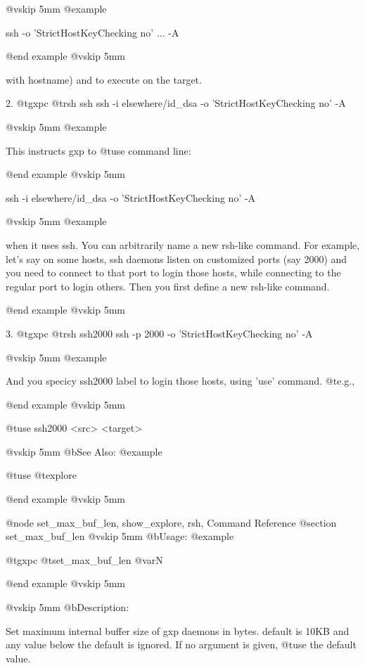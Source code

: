 @vskip 5mm
@example

         ssh -o 'StrictHostKeyChecking no' ... -A %

@end example
@vskip 5mm

  with %
  hostname) and %
  to execute on the target.
  
2.   
  @t{gxpc} @t{rsh} ssh ssh -i elsewhere/id_dsa -o 'StrictHostKeyChecking no' -A %

@vskip 5mm
@example

  This instructs gxp to @t{use} command line:

@end example
@vskip 5mm

     ssh -i elsewhere/id_dsa -o 'StrictHostKeyChecking no' -A %

@vskip 5mm
@example

  when it uses ssh.  You can arbitrarily name a new rsh-like command. 
  For example, let's say on some hosts, ssh daemons listen on customized 
  ports (say 2000) and you need to connect to that port to login those 
  hosts, while connecting to the regular port to login others. Then you 
  first define a new rsh-like command.

@end example
@vskip 5mm
  
3.
  @t{gxpc} @t{rsh} ssh2000 ssh -p 2000 -o 'StrictHostKeyChecking no' -A %

@vskip 5mm
@example

  And you specicy ssh2000 label to login those hosts, using 'use' command. @t{e}.g.,

@end example
@vskip 5mm

     @t{use} ssh2000 <src> <target>

@vskip 5mm
@b{See Also:}
@example

  @t{use} @t{explore}

@end example
@vskip 5mm


@node set_max_buf_len, show_explore, rsh, Command Reference
@section set_max_buf_len
@vskip 5mm
@b{Usage:}
@example

  @t{gxpc} @t{set_max_buf_len} @var{N}

@end example
@vskip 5mm

@vskip 5mm
@b{Description:}


  Set maximum internal buffer size of gxp daemons in bytes.
  default is 10KB and any value below the default is ignored. If no argument
  is given, @t{use} the default value.

